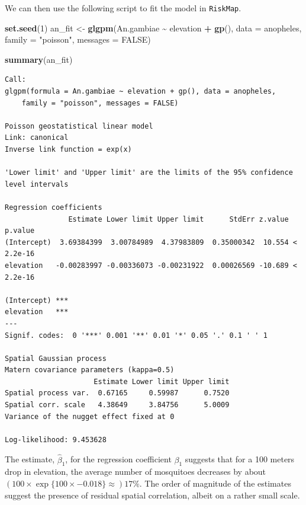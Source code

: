\documentclass[
  letterpaper,
]{krantz}
\newenvironment{Shaded}{\begin{snugshade}}{\end{snugshade}}
\newcommand{\AttributeTok}[1]{\textcolor[rgb]{0.13,0.29,0.53}{#1}}
\newcommand{\ConstantTok}[1]{\textcolor[rgb]{0.56,0.35,0.01}{#1}}
\newcommand{\DecValTok}[1]{\textcolor[rgb]{0.00,0.00,0.81}{#1}}
\newcommand{\FunctionTok}[1]{\textcolor[rgb]{0.13,0.29,0.53}{\textbf{#1}}}
\newcommand{\NormalTok}[1]{#1}
\newcommand{\OtherTok}[1]{\textcolor[rgb]{0.56,0.35,0.01}{#1}}
\newcommand{\SpecialCharTok}[1]{\textcolor[rgb]{0.81,0.36,0.00}{\textbf{#1}}}
\newcommand{\StringTok}[1]{\textcolor[rgb]{0.31,0.60,0.02}{#1}}
\begin{document}
We can then use the following script to fit the model in
\texttt{RiskMap}.

\begin{Shaded}
\begin{Highlighting}[]
\FunctionTok{set.seed}\NormalTok{(}\DecValTok{1}\NormalTok{)}
\NormalTok{an\_fit }\OtherTok{\textless{}{-}} 
\FunctionTok{glgpm}\NormalTok{(An.gambiae }\SpecialCharTok{\textasciitilde{}}\NormalTok{ elevation }\SpecialCharTok{+} \FunctionTok{gp}\NormalTok{(),}
      \AttributeTok{data =}\NormalTok{ anopheles, }
      \AttributeTok{family =} \StringTok{"poisson"}\NormalTok{, }\AttributeTok{messages =} \ConstantTok{FALSE}\NormalTok{)}

\FunctionTok{summary}\NormalTok{(an\_fit)}
\end{Highlighting}
\end{Shaded}

\begin{verbatim}
Call:
glgpm(formula = An.gambiae ~ elevation + gp(), data = anopheles, 
    family = "poisson", messages = FALSE)

Poisson geostatistical linear model
Link: canonical 
Inverse link function = exp(x) 
 
'Lower limit' and 'Upper limit' are the limits of the 95% confidence level intervals

Regression coefficients
               Estimate Lower limit Upper limit      StdErr z.value   p.value
(Intercept)  3.69384399  3.00784989  4.37983809  0.35000342  10.554 < 2.2e-16
elevation   -0.00283997 -0.00336073 -0.00231922  0.00026569 -10.689 < 2.2e-16
               
(Intercept) ***
elevation   ***
---
Signif. codes:  0 '***' 0.001 '**' 0.01 '*' 0.05 '.' 0.1 ' ' 1

Spatial Gaussian process
Matern covariance parameters (kappa=0.5)
                     Estimate Lower limit Upper limit
Spatial process var.  0.67165     0.59987      0.7520
Spatial corr. scale   4.38649     3.84756      5.0009
Variance of the nugget effect fixed at 0

Log-likelihood: 9.453628
\end{verbatim}

The estimate, \(\hat{\beta}_1\), for the regression coefficient
\(\beta_1\) suggests that for a 100 meters drop in elevation, the
average number of mosquitoes decreases by about
\((100\times\exp\{100\times -0.018\}\approx)17\%\). The order of
magnitude of the estimates suggest the presence of residual spatial
correlation, albeit on a rather small scale.
\end{document}
